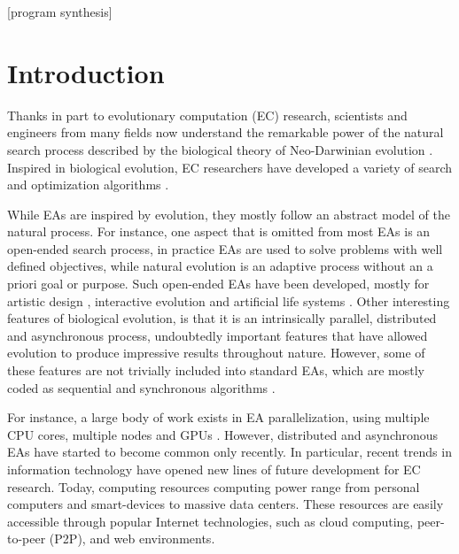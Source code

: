 \documentclass{sig-alternate}
\begin{document}
[program synthesis]

\keywords{}

\section{Introduction}
\label{sec:intro}
Thanks in part  to evolutionary computation (EC) research, scientists and engineers from many fields now understand the remarkable power of
the natural search process described by the biological theory of Neo-Darwinian evolution \cite{holland}. 
Inspired in biological evolution, EC researchers have developed a variety of search and optimization algorithms \cite{eiben}.

While EAs are inspired by evolution, they mostly follow an abstract model of the natural process.
For instance, one aspect that is omitted from most EAs is an open-ended search process,
in practice EAs are used to solve problems with well defined objectives, while natural evolution is an adaptive process without an a priori goal or purpose.
Such open-ended EAs have been developed, mostly for artistic design \cite{Musart}, interactive evolution \cite{ie1} and artificial life systems \cite{avida}.
Other interesting features of biological evolution, is that it is an intrinsically parallel, distributed and asynchronous process,
undoubtedly important features that have allowed evolution to produce impressive results throughout nature.
However, some of these features are not trivially included into standard EAs,
which are mostly coded as sequential and synchronous algorithms \cite{eiben}.

For instance, a large body of work exists in EA parallelization, using multiple CPU cores, multiple nodes and GPUs \cite{}.
However, distributed and asynchronous EAs have started to become common only recently.
In particular, recent trends in information technology have opened new lines of future development for EC research.
Today, computing resources computing power range from personal computers and smart-devices to massive data centers.
These resources are easily accessible through popular Internet technologies, such as cloud computing, 
peer-to-peer (P2P), and web environments.
\end{document}
